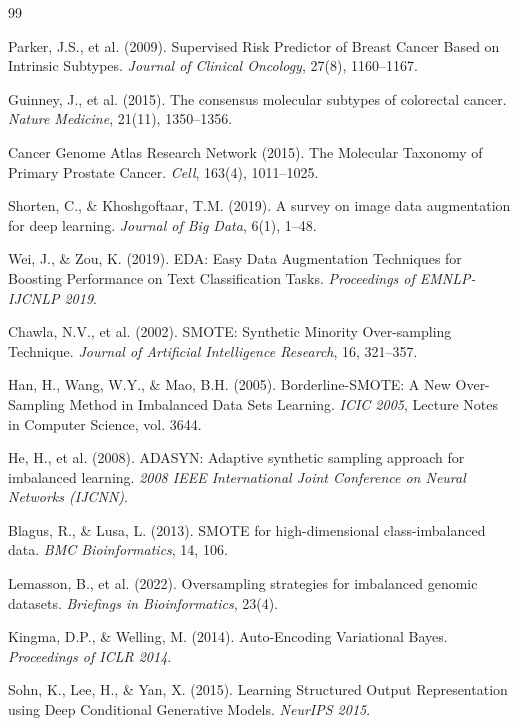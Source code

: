 \documentclass{article}
\begin{document}

\begin{thebibliography}{99}

Parker, J.S., et al. (2009).
Supervised Risk Predictor of Breast Cancer Based on Intrinsic Subtypes.
\textit{Journal of Clinical Oncology}, 27(8), 1160--1167.

Guinney, J., et al. (2015).
The consensus molecular subtypes of colorectal cancer.
\textit{Nature Medicine}, 21(11), 1350--1356.

Cancer Genome Atlas Research Network (2015).
The Molecular Taxonomy of Primary Prostate Cancer.
\textit{Cell}, 163(4), 1011--1025.

Shorten, C., \& Khoshgoftaar, T.M. (2019).
A survey on image data augmentation for deep learning.
\textit{Journal of Big Data}, 6(1), 1--48.

Wei, J., \& Zou, K. (2019).
EDA: Easy Data Augmentation Techniques for Boosting Performance on Text Classification Tasks.
\textit{Proceedings of EMNLP-IJCNLP 2019}.

Chawla, N.V., et al. (2002).
SMOTE: Synthetic Minority Over-sampling Technique.
\textit{Journal of Artificial Intelligence Research}, 16, 321--357.

Han, H., Wang, W.Y., \& Mao, B.H. (2005).
Borderline-SMOTE: A New Over-Sampling Method in Imbalanced Data Sets Learning.
\textit{ICIC 2005}, Lecture Notes in Computer Science, vol. 3644.

He, H., et al. (2008).
ADASYN: Adaptive synthetic sampling approach for imbalanced learning.
\textit{2008 IEEE International Joint Conference on Neural Networks (IJCNN)}.

Blagus, R., \& Lusa, L. (2013).
SMOTE for high-dimensional class-imbalanced data.
\textit{BMC Bioinformatics}, 14, 106.

Lemasson, B., et al. (2022).
Oversampling strategies for imbalanced genomic datasets.
\textit{Briefings in Bioinformatics}, 23(4).

Kingma, D.P., \& Welling, M. (2014).
Auto-Encoding Variational Bayes.
\textit{Proceedings of ICLR 2014}.

Sohn, K., Lee, H., \& Yan, X. (2015).
Learning Structured Output Representation using Deep Conditional Generative Models.
\textit{NeurIPS 2015}.


\end{thebibliography}
\end{document}
